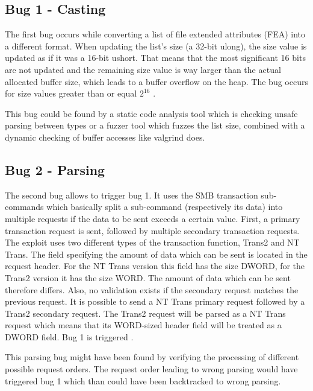 \documentclass[a4paper]{article}
\begin{document}
\subsection{Bug 1 - Casting}
The first bug occurs while converting a list of file extended attributes (FEA) into a different format. When updating the list's size (a 32-bit ulong), the size value is updated as if it was a 16-bit ushort. That means that the most significant 16 bits are not updated and the remaining size value is way larger than the actual allocated buffer size, which leads to a buffer overflow on the heap. The bug occurs for size values greater than or equal $2^{16}$ \cite{mssecurity2}.

This bug could be found by a static code analysis tool which is checking unsafe parsing between types or a fuzzer tool which fuzzes the list size, combined with a dynamic checking of buffer accesses like valgrind does.

\subsection{Bug 2 - Parsing}
The second bug allows to trigger bug 1. It uses the SMB transaction sub-commands which basically split a sub-command (respectively its data) into multiple requests if the data to be sent exceeds a certain value. First, a primary transaction request is sent, followed by multiple secondary transaction requests.
The exploit uses two different types of the transaction function, Trans2 and NT Trans. The field specifying the amount of data which can be sent is located in the request header. For the NT Trans version this field has the size DWORD, for the Trans2 version it has the size WORD. The amount of data which can be sent therefore differs. Also, no validation exists if the secondary request matches the previous request. It is possible to send a NT Trans primary request followed by a Trans2 secondary request. The Trans2 request will be parsed as a NT Trans request which means that its WORD-sized header field will be treated as a DWORD field. Bug 1 is triggered \cite{checkpoint}.

This parsing bug might have been found by verifying the processing of different possible request orders. The request order leading to wrong parsing would have triggered bug 1 which than could have been backtracked to wrong parsing.
\end{document}
